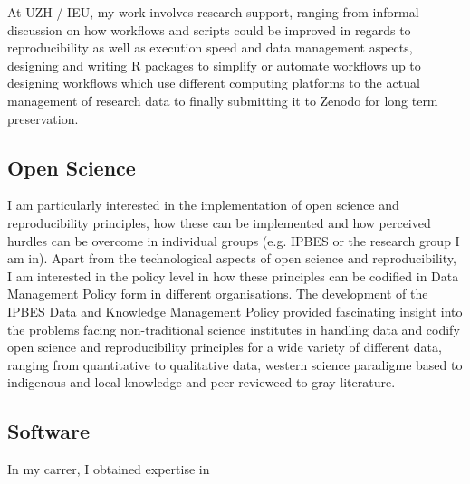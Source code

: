 \documentclass[a4paper]{article}
\begin{document}
At UZH / IEU, my work involves research support,
	ranging from informal discussion on how workflows and scripts could
	be improved in regards to reproducibility as well as execution speed
	and data management aspects, designing and writing R packages to
	simplify or automate workflows up to designing workflows which use
	different computing platforms to the actual management of research
	data to finally submitting it to Zenodo for long term preservation.


\subsection{Open Science}

I am particularly interested in the implementation of open science and
	reproducibility principles, how these can be implemented and how
	perceived hurdles can be overcome in individual groups (e.g. IPBES or
	the research group I am in). 
Apart from the technological aspects of open science and reproducibility, 
  I am interested in the policy level in how these principles can be codified
  in Data Management Policy form in different organisations. The development
  of the IPBES Data and Knowledge Management Policy provided fascinating insight
  into the problems facing non-traditional science institutes in handling data 
  and codify open science and reproducibility principles for a wide variety of different data, ranging from
  quantitative to qualitative data, western science paradigme based to
  indigenous and local knowledge and peer revieweed to gray literature.

\subsection{Software}

In my carrer, I obtained expertise in
\end{document}

